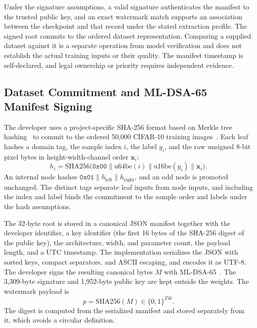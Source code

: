 Under the signature assumptions, a valid signature authenticates the manifest to the trusted public key, and an exact watermark match supports an association between the checkpoint and that record under the stated extraction profile. The signed root commits to the ordered dataset representation. Comparing a supplied dataset against it is a separate operation from model verification and does not establish the actual training inputs or their quality. The manifest timestamp is self-declared, and legal ownership or priority requires independent evidence.

\subsection{Dataset Commitment and ML-DSA-65 Manifest Signing}
The developer uses a project-specific SHA-256 format based on Merkle tree hashing~\cite{merkle1987digital} to commit to the ordered 50,000 CIFAR-10 training images~\cite{cifar10}. Each leaf hashes a domain tag, the sample index $i$, the label $y_i$, and the raw unsigned 8-bit pixel bytes in height-width-channel order $\mathbf{x}_i$:
\begin{equation}
  h_i = \mathrm{SHA256}\bigl(\texttt{0x00} \parallel \mathrm{u64be}(i)
      \parallel \mathrm{u16be}(y_i) \parallel \mathbf{x}_i\bigr).
\end{equation}
An internal node hashes $\texttt{0x01} \parallel h_{\mathrm{left}} \parallel h_{\mathrm{right}}$, and an odd node is promoted unchanged. The distinct tags separate leaf inputs from node inputs, and including the index and label binds the commitment to the sample order and labels under the hash assumptions.

The 32-byte root is stored in a canonical JSON manifest together with the developer identifier, a key identifier (the first 16 bytes of the SHA-256 digest of the public key), the architecture, width, and parameter count, the payload length, and a UTC timestamp. The implementation serializes the JSON with sorted keys, compact separators, and ASCII escaping, and encodes it as UTF-8. The developer signs the resulting canonical bytes $M$ with ML-DSA-65~\cite{nist204}. The 3,309-byte signature and 1,952-byte public key are kept outside the weights. The watermark payload is
\begin{equation}
  p = \mathrm{SHA256}(M) \in \{0,1\}^{256}.
\end{equation}
The digest is computed from the serialized manifest and stored separately from it, which avoids a circular definition.

